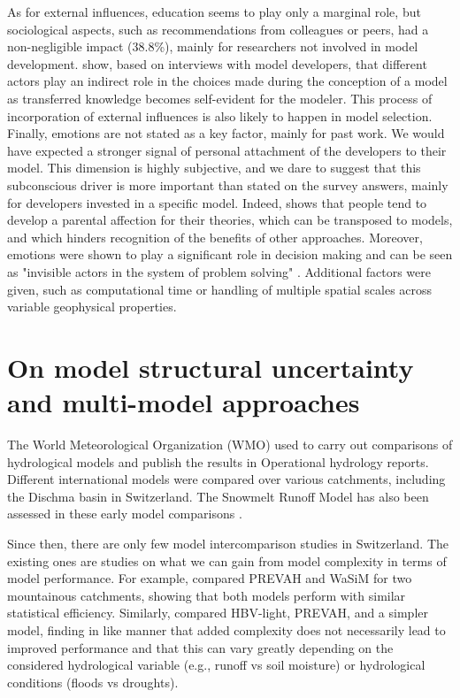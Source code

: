 \documentclass[10pt,a4paper]{article}
\begin{document}
As for external influences, education seems to play only a marginal role, but sociological aspects, such as recommendations from colleagues or peers, had a non-negligible impact (38.8\%), mainly for researchers not involved in model development. \citet{Babel2019} show, based on interviews with model developers, that different actors play an indirect role in the choices made during the conception of a model as transferred knowledge becomes self-evident for the modeler. This process of incorporation of external influences is also likely to happen in model selection. Finally, emotions are not stated as a key factor, mainly for past work. We would have expected a stronger signal of personal attachment of the developers to their model. This dimension is highly subjective, and we dare to suggest that this subconscious driver is more important than stated on the survey answers, mainly for developers invested in a specific model. Indeed, \citet{Chamberlin1890} shows that people tend to develop a parental affection for their theories, which can be transposed to models, and which hinders recognition of the benefits of other approaches. Moreover, emotions were shown to play a significant role in decision making and can be seen as "invisible actors in the system of problem solving" \citep{Hamalainen2015}. Additional factors were given, such as computational time or handling of multiple spatial scales across variable geophysical properties.


\section{On model structural uncertainty and multi-model approaches}
\label{sec:multi-model}

The World Meteorological Organization (WMO) used to carry out comparisons of hydrological models and publish the results in Operational hydrology reports. Different international models were compared over various catchments, including the Dischma basin in Switzerland. The Snowmelt Runoff Model \citep[SRM,][see supplementary material]{Martinec1975} has also been assessed in these early model comparisons \citep{WMO1986, WMO1992a}.

Since then, there are only few model intercomparison studies in Switzerland. The existing ones are studies on what we can gain from model complexity in terms of model performance. For example, \citet{Gurtz2003} compared PREVAH and WaSiM for two mountainous catchments, showing that both models perform with similar statistical efficiency. Similarly, \citet{Orth2015} compared HBV-light, PREVAH, and a simpler model, finding in like manner that added complexity does not necessarily lead to improved performance and that this can vary greatly depending on the considered hydrological variable (e.g., runoff vs soil moisture) or hydrological conditions (floods vs droughts). 
\end{document}

